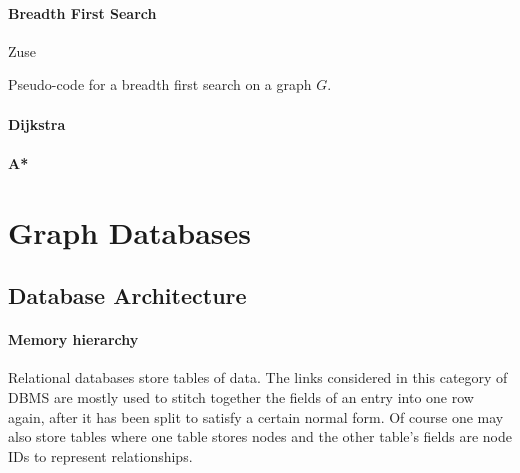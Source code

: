         \paragraph{Breadth First Search} 
        Zuse
        
        \begin{algorithm}[htp]
            \hrulealg
        \caption{Pseudo-code for a breadth first search on a graph $G$.}\label{bfs}
        \end{algorithm}
        
        \paragraph{Dijkstra}
        \paragraph{A*}
        
            
\section{Graph Databases}\label{\positionnumber}
    \subsection{Database Architecture}\label{\positionnumber}
            \paragraph{Memory hierarchy}
        Relational databases store tables of data.
        The links considered in this category of DBMS are mostly used to stitch together the fields of an entry into one row again, after it has been split to satisfy a certain normal form.
        Of course one may also store tables where one table stores nodes and the other table's fields are node IDs to represent relationships.

